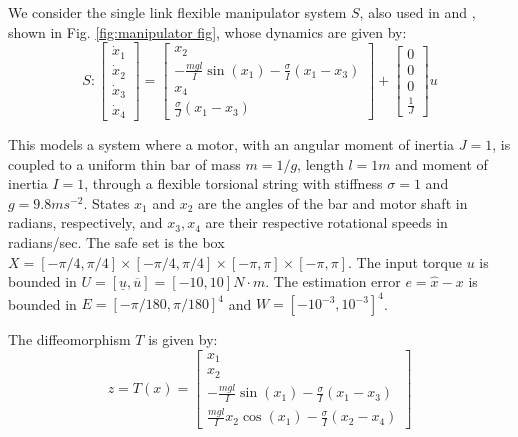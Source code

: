 We consider the single link flexible manipulator system $S$, also used in  \cite{parameter} and \cite{intech}, shown in Fig. \ref{fig:manipulator fig}, whose dynamics are given by:
\begin{equation}
S: \begin{bmatrix} \dot{x}_1 \\ \dot{x}_2 \\ \dot{x}_3 \\ \dot{x}_4    \end{bmatrix} = \begin{bmatrix} x_2 \\ -\frac{mgl}{I}\sin(x_1) - \frac{\sigma}{I}(x_1-x_3)  \\ x_4 \\ \frac{\sigma}{J}(x_1-x_3)  \end{bmatrix} + \begin{bmatrix} 0 \\ 0 \\ 0 \\ \frac{1}{J} \end{bmatrix}u \nonumber
\end{equation}

This models a system where a motor, with an angular moment of inertia $J=1$,  is coupled to a uniform thin bar of mass $m=1/g$, length $l=1m$ and moment of inertia $I=1$, through a flexible torsional string with stiffness $\sigma=1$ and $g=9.8ms^{-2}$. 
States $x_1$ and $x_2$ are the angles of the bar and motor shaft in radians, respectively, and $x_3, x_4$ are their respective rotational speeds in radians/sec.
The safe set is the box $X = [-\pi/4,\pi/4] \times [-\pi/4,\pi/4] \times [-\pi,\pi] \times [-\pi,\pi]$.
The input torque $u$ is bounded in $U = [\underline{u}, \overline{u}] = [-10 , 10 ]N\cdot m$. 
The estimation error $e = \hat{x} - x$ is bounded in $E = [-\pi /180, \pi /180]^4$ and $W=[-10^{-3}, 10^{-3}]^4$.

The diffeomorphism $T$ is given by:
\begin{equation}
z = T(x) = \begin{bmatrix} x_1 \\ x_2 \\ -\frac{mgl}{I}\sin(x_1) -\frac{\sigma}{I}(x_1-x_3) \\ \frac{mgl}{I}x_2\cos(x_1) - \frac{\sigma}{I}(x_2-x_4)   \end{bmatrix} \nonumber
\end{equation}


